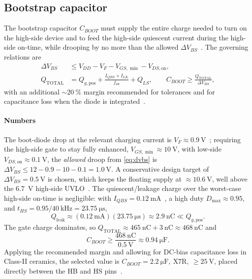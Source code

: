 \documentclass[journal,onecolumn,11pt]{IEEEtran}
\newcommand{\fsw}{f_{\mathrm{sw}}}
\begin{document}
\subsection{Bootstrap capacitor}\label{sec:cboot}
The bootstrap capacitor $C_{BOOT}$ must supply the entire charge needed to turn on the high-side
device and to feed the high-side quiescent current during the high-side on-time, while drooping by
no more than the allowed $\Delta V_{BS}$~\cite{ir_an978,ir_an1123}. The governing relations are
\begin{align}
\Delta V_{BS} &\le V_{DD} - V_{F} - V_{GS,\min} - V_{DS,\mathrm{on}}, \label{eq:dvbs}\\
Q_{\mathrm{TOTAL}} &= Q_{g,\mathrm{pos}} + \frac{I_{QBS}+I_{LK}}{\fsw} + Q_{LS},
   \qquad C_{BOOT} \ge \frac{Q_{\mathrm{TOTAL}}}{\Delta V_{BS}}, \label{eq:cboot}
\end{align}
with an additional $\sim\SI{20}{\percent}$ margin recommended for tolerances and for capacitance
loss when the diode is integrated~\cite{ir_an1123}.

\paragraph{Numbers} The boot-diode drop at the relevant charging current is
$V_F\approx\SI{0.9}{\volt}$~\cite{ucc27211}; requiring the high-side gate to stay fully enhanced,
$V_{GS,\min}\approx\SI{10}{\volt}$, with low-side $V_{DS,\mathrm{on}}\approx\SI{0.1}{\volt}$, the
\emph{allowed} droop from \eqref{eq:dvbs} is $\Delta V_{BS}\le 12-0.9-10-0.1=\SI{1.0}{\volt}$. A
conservative design target of $\Delta V_{BS}=\SI{0.5}{\volt}$ is chosen, which keeps the floating
supply at $\approx\SI{10.6}{\volt}$, well above the \SI{6.7}{\volt} high-side UVLO~\cite{ucc27211}.
The quiescent/leakage charge over the worst-case high-side on-time is negligible: with
$I_{QBS}=\SI{0.12}{\milli\ampere}$~\cite{ucc27211}, a high duty $D_{\max}\approx0.95$, and
$t_{HS}=0.95/\SI{40}{\kilo\hertz}=\SI{23.75}{\micro\second}$,
\begin{equation}
Q_{\mathrm{leak}} \approx (\SI{0.12}{\milli\ampere})(\SI{23.75}{\micro\second}) \approx \SI{2.9}{\nano\coulomb} \ll Q_{g,\mathrm{pos}} .
\end{equation}
The gate charge dominates, so $Q_{\mathrm{TOTAL}}\approx\SI{465}{\nano\coulomb}+\SI{3}{\nano\coulomb}\approx\SI{468}{\nano\coulomb}$ and
\begin{equation}
C_{BOOT} \ge \frac{\SI{468}{\nano\coulomb}}{\SI{0.5}{\volt}} \approx \SI{0.94}{\micro\farad}.
\end{equation}
Applying the recommended margin and allowing for DC-bias capacitance loss in Class-II ceramics, the
selected value is $\boxed{C_{BOOT}=\SI{2.2}{\micro\farad},\ \text{X7R},\ \ge\SI{25}{\volt}}$, placed
directly between the HB and HS pins~\cite{ucc27211,ir_an1123}.
\end{document}
